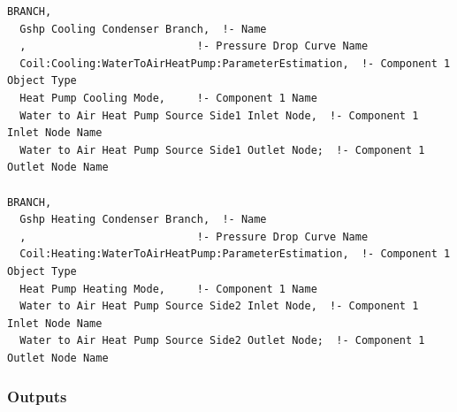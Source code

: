 \begin{lstlisting}
BRANCH,
  Gshp Cooling Condenser Branch,  !- Name
  ,                           !- Pressure Drop Curve Name
  Coil:Cooling:WaterToAirHeatPump:ParameterEstimation,  !- Component 1 Object Type
  Heat Pump Cooling Mode,     !- Component 1 Name
  Water to Air Heat Pump Source Side1 Inlet Node,  !- Component 1 Inlet Node Name
  Water to Air Heat Pump Source Side1 Outlet Node;  !- Component 1 Outlet Node Name

BRANCH,
  Gshp Heating Condenser Branch,  !- Name
  ,                           !- Pressure Drop Curve Name
  Coil:Heating:WaterToAirHeatPump:ParameterEstimation,  !- Component 1 Object Type
  Heat Pump Heating Mode,     !- Component 1 Name
  Water to Air Heat Pump Source Side2 Inlet Node,  !- Component 1 Inlet Node Name
  Water to Air Heat Pump Source Side2 Outlet Node;  !- Component 1 Outlet Node Name
\end{lstlisting}

\subsubsection{Outputs}\label{outputs-9-009}

